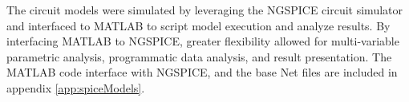 \par The circuit models were simulated by leveraging the NGSPICE circuit simulator and interfaced to MATLAB to script model execution and analyze results. By interfacing MATLAB to NGSPICE, greater flexibility allowed for multi-variable parametric analysis, programmatic data analysis, and result presentation. The MATLAB code interface with NGSPICE, and the base Net files are included in appendix \ref{app:spiceModels}. 

